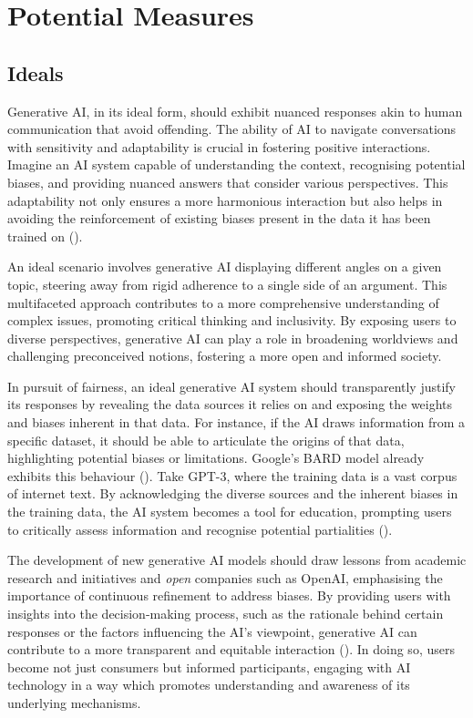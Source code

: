 \documentclass[12pt]{article}
\begin{document}
\newpage

\section{Potential Measures}

\subsection{Ideals}

Generative AI, in its ideal form, should exhibit nuanced responses akin to human communication that avoid offending. The ability of AI to navigate conversations with sensitivity and adaptability is crucial in fostering positive interactions. Imagine an AI system capable of understanding the context, recognising potential biases, and providing nuanced answers that consider various perspectives. This adaptability not only ensures a more harmonious interaction but also helps in avoiding the reinforcement of existing biases present in the data it has been trained on (\cite{hao-2023}). 

An ideal scenario involves generative AI displaying different angles on a given topic, steering away from rigid adherence to a single side of an argument. This multifaceted approach contributes to a more comprehensive understanding of complex issues, promoting critical thinking and inclusivity. By exposing users to diverse perspectives, generative AI can play a role in broadening worldviews and challenging preconceived notions, fostering a more open and informed society. 

In pursuit of fairness, an ideal generative AI system should transparently justify its responses by revealing the data sources it relies on and exposing the weights and biases inherent in that data. For instance, if the AI draws information from a specific dataset, it should be able to articulate the origins of that data, highlighting potential biases or limitations. Google's BARD model already exhibits this behaviour (\cite{southern-2023}). Take GPT-3, where the training data is a vast corpus of internet text. By acknowledging the diverse sources and the inherent biases in the training data, the AI system becomes a tool for education, prompting users to critically assess information and recognise potential partialities (\cite{gupta-2023}).

The development of new generative AI models should draw lessons from academic research and initiatives and \textit{open} companies such as OpenAI, emphasising the importance of continuous refinement to address biases. By providing users with insights into the decision-making process, such as the rationale behind certain responses or the factors influencing the AI's viewpoint, generative AI can contribute to a more transparent and equitable interaction (\cite{openai-no-dateB}). In doing so, users become not just consumers but informed participants, engaging with AI technology in a way which promotes understanding and awareness of its underlying mechanisms. 
\end{document}
